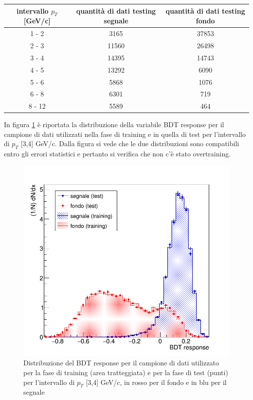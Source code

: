     \begin{table}[H]
		\centering
		\begin{tabular}{c|c|c}
		    \toprule
		    intervallo $p_T$ [GeV/c]  &  quantità di dati testing segnale & quantità di dati testing fondo  \\
            \midrule
            1 - 2  	&  3165   &  37853  \\ 
            2 - 3 	&  11560   &  26498  \\
            3 - 4  	&  14395   &  14743  \\ 
            4 - 5  	&  13292   &  6090 \\ 
            5 - 6  	&  5868   &  1076  \\ 
            6 - 8  	&  6301   &  719  \\ 
            8 - 12  &  5589   &   464 \\   
			\bottomrule
		\end{tabular}
	\end{table}
    
    In figura \ref{fig:testing_3_4} è riportata la distribuzione della variabile BDT response per il campione di dati utilizzati nella fase di training e in quella di test per l'intervallo di $p_T$ [3,4] GeV/c. Dalla figura si vede che le due distribuzioni sono compatibili entro gli errori statistici e pertanto si verifica che non c'è stato overtraining.
    
    
    \begin{figure}[htbp] 
        \centering
        \includegraphics[width=0.7\linewidth]{training&testing/distribuzione_test_train.png}
        \caption{Distribuzione del BDT response per il campione di dati utilizzato per la fase di training (area tratteggiata) e per la fase di test (punti) per l'intervallo di $p_T$ [3,4] GeV/c, in rosso per il fondo e in blu per il segnale}
        \label{fig:testing_3_4}
    \end{figure}
 
